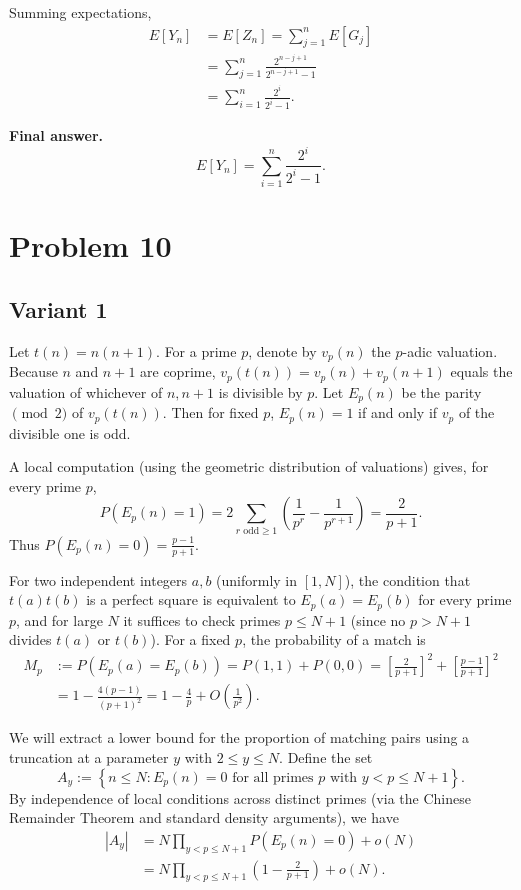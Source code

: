 \documentclass[12pt,a4paper]{article}
\theoremstyle{definition}
\begin{document}
    Summing expectations,
    \begin{align}
        E[Y_n] &= E[Z_n] = \sum_{j=1}^{n} E[G_j]\\
        &= \sum_{j=1}^{n} \frac{2^{n-j+1}}{2^{n-j+1} - 1}\\
        &= \sum_{i=1}^{n} \frac{2^{i}}{2^{i} - 1}.
    \end{align}

    \textbf{Final answer.}
    $$E[Y_n] = \sum_{i=1}^{n} \frac{2^{i}}{2^{i} - 1}.$$

    \section{Problem 10}
    \subsection{Variant 1}
    Let $t(n) = n(n+1)$. For a prime $p$, denote by $v_p(n)$ the $p$-adic valuation. Because $n$ and $n+1$ are coprime, $v_p(t(n)) = v_p(n) + v_p(n+1)$ equals the valuation of whichever of $n,n+1$ is divisible by $p$. Let $E_p(n)$ be the parity $\pmod{2}$ of $v_p(t(n))$. Then for fixed $p$, $E_p(n) = 1$ if and only if $v_p$ of the divisible one is odd.

    A local computation (using the geometric distribution of valuations) gives, for every prime $p$,
    $$P(E_p(n) = 1) = 2 \sum_{r \text{ odd} \geq 1} \left(\frac{1}{p^r} - \frac{1}{p^{r+1}}\right) = \frac{2}{p+1}.$$
    Thus $P(E_p(n) = 0) = \frac{p-1}{p+1}$.

    For two independent integers $a,b$ (uniformly in $[1,N]$), the condition that $t(a)t(b)$ is a perfect square is equivalent to $E_p(a) = E_p(b)$ for every prime $p$, and for large $N$ it suffices to check primes $p \leq N+1$ (since no $p > N+1$ divides $t(a)$ or $t(b)$). For a fixed $p$, the probability of a match is
    \begin{align}
        M_p &:= P(E_p(a) = E_p(b)) = P(1,1) + P(0,0) = \left[\frac{2}{p+1}\right]^2 + \left[\frac{p-1}{p+1}\right]^2\\
        &= 1 - \frac{4(p-1)}{(p+1)^2} = 1 - \frac{4}{p} + O\left(\frac{1}{p^2}\right).
    \end{align}

    We will extract a lower bound for the proportion of matching pairs using a truncation at a parameter $y$ with $2 \leq y \leq N$. Define the set
    $$A_y := \left\{n \leq N : E_p(n) = 0 \text{ for all primes } p \text{ with } y < p \leq N+1\right\}.$$
    By independence of local conditions across distinct primes (via the Chinese Remainder Theorem and standard density arguments), we have
    \begin{align}
        |A_y| &= N \prod_{y < p \leq N+1} P(E_p(n) = 0) + o(N)\\
        &= N \prod_{y < p \leq N+1} \left(1 - \frac{2}{p+1}\right) + o(N).
    \end{align}
\end{document}
